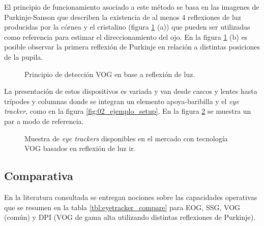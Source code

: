 \documentclass[../main.tex]{subfiles}
\begin{document}
\begin{enumerate}
				El principio de funcionamiento asociado a este método se basa en las imagenes de Purkinje-Sanson que describen la existencia de al menos 4 reflexiones de luz producidas por la córnea y el cristalino (figura \ref{fig:02_et_vog1} (a)) que pueden ser utilizadas como referencia para estimar el direccionamiento del ojo. En la figura \ref{fig:02_et_vog1} (b) es posible observar la primera reflexión de Purkinje en relación a distintas posiciones de la pupila.
				\begin{figure}[H]
					\centering
					\hspace{5mm}
					\caption[Principio de detección VOG en base a reflexión de luz]{Principio de detección VOG en base a reflexión de luz\cite{dissertation:eyetrackers}.}
					\label{fig:02_et_vog1}
				\end{figure}

				La presentación de estos dispositivos es variada y van desde cascos y lentes hasta trípodes y columnas donde se integran un elemento apoya-baribilla y el \textit{eye tracker}, como en la figura \ref{fig:02_ejemplo_setup}. En la figura \ref{fig:02_et_vog2} se muestra un par a modo de referencia. 
				\begin{figure}[H]
					\centering
					\hspace{5mm}
					\caption[Muestra de \textit{eye trackers} disponibles en el mercado con tecnología VOG basados en reflexión de luz \acrshort{ir}]{Muestra de \textit{eye trackers} disponibles en el mercado con tecnología VOG basados en reflexión de luz \acrshort{ir}\footnotemark.}
					\label{fig:02_et_vog2}
				\end{figure}

			\end{enumerate}

		\subsection{Comparativa}
		\label{sub:02_comparativa_eyetracker}
			En la literatura consultada \cite{dissertation:eyetrackers, article:eyetracker_eggert, article:eyetracker_richardson} se entregan nociones sobre las capacidades operativas que se resumen en la tabla \ref{tbl:eyetracker_compare} para EOG, SSG, VOG (común) y DPI (VOG de gama alta utilizando distintas reflexiones de Purkinje). 
\end{document}

